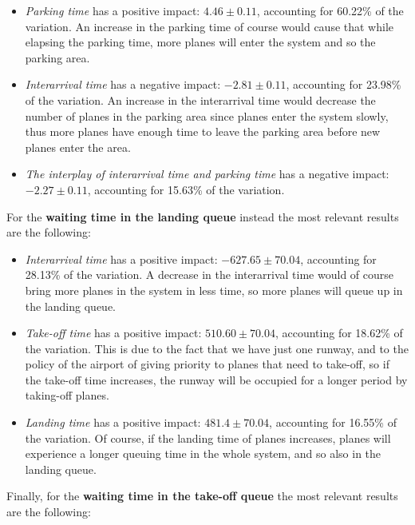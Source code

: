 \documentclass[12pt]{article}
\begin{document}
\begin{itemize}
    \item \textit{Parking time} has a positive impact: $ 4.46 \pm  0.11 $, accounting for 60.22\% of the variation. An increase in the parking time of course would cause that while elapsing the parking time, more planes will enter the system and so the parking area.
    \item \textit{Interarrival time} has a negative impact: $-2.81 \pm  0.11 $, accounting for 23.98\% of the variation. An increase in the interarrival time would decrease the number of planes in the parking area since planes enter the system slowly, thus more planes have enough time to leave the parking area before new planes enter the area. 
    \item \textit{The interplay of interarrival time and parking time} has a negative impact: $-2.27 \pm  0.11 $, accounting for 15.63\% of the variation.
\end{itemize}

For the \textbf{waiting time in the landing queue} instead the most relevant results are the following:

\begin{itemize}
    \item \textit{Interarrival time} has a positive impact: $-627.65 \pm  70.04 $, accounting for 28.13\% of the variation. A decrease in the interarrival time would of course bring more planes in the system in less time, so more planes will queue up in the landing queue. 
    \item \textit{Take-off time} has a positive impact: $ 510.60 \pm  70.04 $, accounting for 18.62\% of the variation. This is due to the fact that we have just one runway, and to the policy of the airport of giving priority to planes that need to take-off, so if the take-off time increases, the runway will be occupied for a longer period by taking-off planes. 
    \item \textit{Landing time} has a positive impact: $ 481.4 \pm  70.04 $, accounting for 16.55\% of the variation. Of course, if the landing time of planes increases, planes will experience a longer queuing time in the whole system, and so also in the landing queue. 
\end{itemize}

Finally, for the \textbf{waiting time in the take-off queue} the most relevant results are the following:
\end{document}
